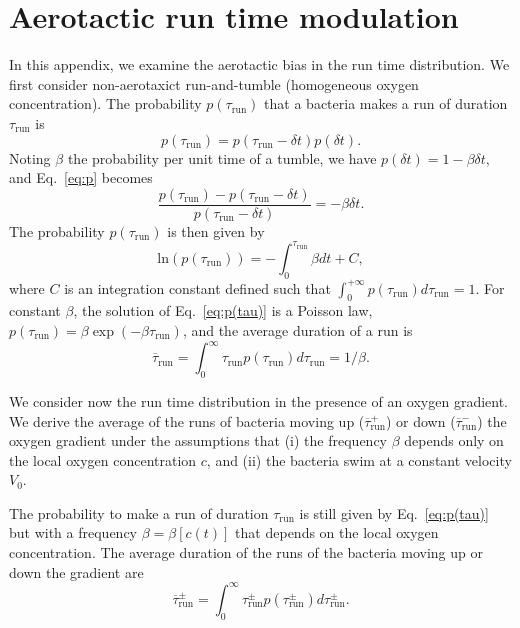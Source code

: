 \documentclass[aps,a4paper,twocolumn,10pt,pre,showpacs]{revtex4-2}
\newcommand{\com}[1]{\textcolor{red}{#1}}
\begin{document}
\section{Aerotactic run time modulation}
\label{app:artm}

In this appendix, we examine the aerotactic bias in the run time distribution. We first consider non-aerotaxict run-and-tumble (homogeneous oxygen concentration). The probability $p(\tau_{\mathrm{run}})$ that a bacteria makes a run of duration $\tau_{\mathrm{run}}$ is
\begin{equation}
    p(\tau_{\mathrm{run}})=p(\tau_{\mathrm{run}}-\delta t) p(\delta t).
    \label{eq:p}
\end{equation}
Noting $\beta$ the probability per unit time of a tumble, we have $p(\delta t)= 1 - \beta \delta t$, and Eq.~\eqref{eq:p} becomes
\begin{equation}
\frac{p(\tau_{\mathrm{run}})-p(\tau_{\mathrm{run}}-\delta t)}{p(\tau_{\mathrm{run}} - \delta t)}=-\beta \delta t.
\end{equation}
The probability $p(\tau_{\mathrm{run}})$ is then given by
\begin{equation}
    \text{ln}(p(\tau_{\mathrm{run}}))=-\int_0^{\tau_{\mathrm{run}}} \beta dt + C,
    \label{eq:p(tau)}
\end{equation}
where $C$ is an integration constant defined such that  $\int_0^{+\infty}p(\tau_{\mathrm{run}})d\tau_{\mathrm{run}}=1$.
For constant $\beta$, the solution of Eq.~\eqref{eq:p(tau)} is a Poisson law, $p(\tau_{\mathrm{run}})=\beta \exp(-\beta \tau_{\mathrm{run}})$, and the average duration of a run is
\begin{equation}
\overline{\tau}_{\mathrm{run}}= \int_0^{\infty} \tau_{\mathrm{run}} p(\tau_{\mathrm{run}}) d\tau_{\mathrm{run}} = 1/\beta.
\label{Eq:tau}
\end{equation}

We consider now the run time distribution in the presence of an oxygen gradient. We derive 
the average of the runs of bacteria moving up ($\overline{\tau}^+_{\mathrm{run}}$) or down ($\overline{\tau}^-_{\mathrm{run}}$) the oxygen gradient under the assumptions that (i) the frequency $\beta$ depends only on the local oxygen concentration $c$, and (ii) the bacteria swim at a constant velocity $V_0$.

The probability to make a run of duration $\tau_{\mathrm{run}}$ is still given by Eq.~\eqref{eq:p(tau)} but with a frequency $\beta=\beta[c(t)]$ that depends on the local oxygen concentration.
The average duration of the runs of the bacteria moving up or down the gradient are
\begin{equation}
    \overline{\tau}^\pm_{\mathrm{run}}=
    \int_0^{\infty} \tau^\pm_{\mathrm{run}} p(\tau^\pm_{\mathrm{run}}) d\tau^\pm_{\mathrm{run}}.
    \label{eq:tau_moyen}
    \end{equation}
\end{document}
